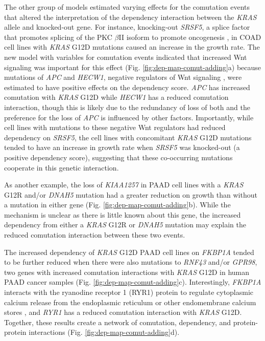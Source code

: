 \documentclass[english, 10pt, letterpaper]{article}
\newcommand{\KRAS}{\emph{KRAS}}
\begin{document}
The other group of models estimated varying effects for the comutation events that altered the interpretation of the dependency interaction between the \KRAS{} allele and knocked-out gene.
For instance, knocking-out \emph{SRSF5}, a splice factor that promotes splicing of the  PKC $\beta$II isoform to promote oncogenesis \cite{Gokmen-Polar2001ElevatedCarcinogenesis., Patel2005MolecularSRp40., Jiang2009Akt2Acid.}, in COAD cell lines with \KRAS{} G12D mutations caused an increase in the growth rate. 
The new model with variables for comutation events indicated that increased Wnt signaling was important for this effect (Fig. \ref{fig:dep-map-comut-adding}a) because mutations of \emph{APC} and \emph{HECW1}, negative regulators of Wnt signaling \cite{Zhan2017, Tauriello2010TheRegulation.}, were estimated to have positive effects on the dependency score.
\emph{APC} has increased comutation with \KRAS{} G12D while \emph{HECW1} has a reduced comutation interaction, though this is likely due to the redundancy of loss of both and the preference for the loss of \emph{APC} is influenced by other factors.
Importantly, while cell lines with mutations to these negative Wnt regulators had reduced dependency on \emph{SRSF5}, the cell lines with concomitant \KRAS{} G12D mutations tended to have an increase in growth rate when \emph{SRSF5} was knocked-out (a positive dependency score), suggesting that these co-occurring mutations cooperate in this genetic interaction.

As another example, the loss of \emph{KIAA1257} in PAAD cell lines with a \KRAS{} G12R and/or \emph{DNAH5} mutation had a greater reduction on growth than without a mutation in either gene (Fig. \ref{fig:dep-map-comut-adding}b).
While the mechanism is unclear as there is little known about this gene, the increased dependency from either a \KRAS{} G12R or \emph{DNAH5} mutation may explain the reduced comutation interaction between these two events.

The increased dependency of \KRAS{} G12D PAAD cell lines on \emph{FKBP1A} tended to be further reduced when there were also mutations to \emph{RNF43} and/or \emph{GPR98}, two genes with increased comutation interactions with \KRAS{} G12D in human PAAD cancer samples (Fig. \ref{fig:dep-map-comut-adding}c).
Interestingly, \emph{FKBP1A} interacts with the ryanodine receptor 1 (RYR1) protein to regulate cytoplasmic calcium release from the endoplasmic reticulum or other endomembrane calcium stores \cite{Jayaraman1992FK506Receptor, Fill2002RyanodineChannels.}, and \emph{RYR1} has a reduced comutation interaction with \KRAS{} G12D.
Together, these results create a network of comutation, dependency, and protein-protein interactions (Fig. \ref{fig:dep-map-comut-adding}d).
\end{document}
